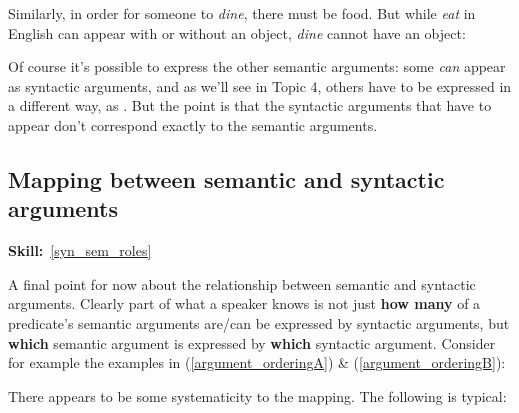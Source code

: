 \documentclass{article}
\begin{document}
Similarly, in order for someone to \emph{dine}, there must be food.  But while \emph{eat} in English can appear with or without an object,  \emph{dine} cannot have an object:
\begin{exe}
\end{exe}

Of course it's possible to express the other semantic arguments:  some \emph{can} appear as syntactic arguments, and as we'll see in Topic 4, others have to be expressed in a different way, as .
But the point is that the syntactic arguments that have to appear don't correspond exactly to the semantic arguments. 

\subsection{Mapping between semantic and syntactic arguments}
\hfill{}\textbf{Skill:}~\ref{syn_sem_roles}

A final point for now about the relationship between semantic and syntactic arguments.
Clearly part of what a speaker knows is not just \textbf{how many} of a predicate's semantic arguments are/can be expressed by syntactic arguments, but \textbf{which} semantic argument is expressed by \textbf{which} syntactic argument.
Consider for example the examples in (\ref{argument_orderingA}) \& (\ref{argument_orderingB}):
\begin{exe}
    \label{argument_orderingA}
    \label{argument_orderingB}
\end{exe}

There appears to be some systematicity to the mapping.
The following is typical:
\begin{exe}
\end{exe}
        
\end{document}
